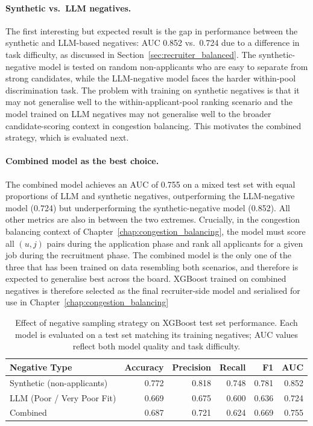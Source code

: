 \paragraph{Synthetic vs.\ LLM negatives.}
The first interesting but expected result is the gap in performance between the synthetic and \gls{LLM}-based negatives: \gls{AUC} 0.852 vs.\ 0.724 due to a difference in task difficulty, as discussed in Section~\ref{sec:recruiter_balanced}. The synthetic-negative model is tested on random non-applicants who are easy to separate from strong candidates, while the LLM-negative model faces the harder within-pool discrimination task. The problem with training on synthetic negatives is that it may not generalise well to the within-applicant-pool ranking scenario and the model trained on \gls{LLM} negatives may not generalise well to the broader candidate-scoring context in congestion balancing. This motivates the combined strategy, which is evaluated next.
 
\paragraph{Combined model as the best choice.}
The combined model achieves an \gls{AUC} of 0.755 on a mixed test set with equal proportions of \gls{LLM} and synthetic negatives, outperforming the LLM-negative model (0.724) but underperforming the synthetic-negative model (0.852). All other metrics are also in between the two extremes. Crucially, in the congestion balancing context of Chapter~\ref{chap:congestion_balancing}, the model must score all $(u,j)$ pairs during the application phase and rank all applicants for a given job during the recruitment phase. The combined model is the only one of the three that has been trained on data resembling both scenarios, and therefore is expected to generalise best across the board. XGBoost trained on combined negatives is therefore selected as the final recruiter-side model and serialised for use in Chapter~\ref{chap:congestion_balancing}

 
\begin{table}[H]
    \centering
    \caption{Effect of negative sampling strategy on XGBoost test set performance. Each model is evaluated on a test set matching its training negatives; AUC values reflect both model quality and task difficulty.}
    \label{tab:recruiter_neg_comparison}
    \begin{tabular}{lrrrrr}
        \toprule
        \textbf{Negative Type} & \textbf{Accuracy} & \textbf{Precision} & \textbf{Recall} & \textbf{F1} & \textbf{AUC} \\
        \midrule
        Synthetic (non-applicants)   & 0.772 & 0.818 & 0.748 & 0.781 & 0.852 \\
        LLM (Poor / Very Poor Fit)   & 0.669 & 0.675 & 0.600 & 0.636 & 0.724 \\
        Combined                     & 0.687 & 0.721 & 0.624 & 0.669 & 0.755 \\
        \bottomrule
    \end{tabular}
\end{table}
 
